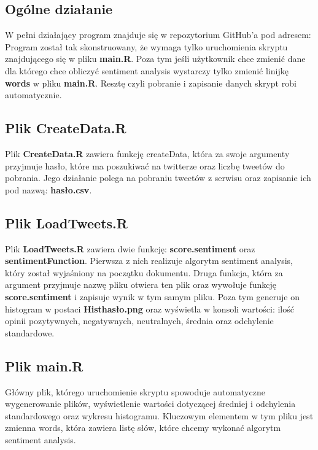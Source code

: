 \documentclass[12pt,a4paper]{report}
\begin{document}
\subsection[Ogólne działanie] {Ogólne działanie}
W pełni działający program znajduje się w repozytorium GitHub'a pod adresem: \\
Program został tak skonstruowany, że wymaga tylko uruchomienia skryptu znajdującego się w pliku \textbf{main.R}. Poza tym jeśli użytkownik chce zmienić dane dla którego chce obliczyć sentiment analysis wystarczy tylko zmienić linijkę \textbf{words} w pliku \textbf{main.R}. Resztę czyli pobranie i zapisanie danych skrypt robi automatycznie.
\subsection[Plik CreateData.R]{Plik CreateData.R}
Plik \textbf{CreateData.R} zawiera funkcję createData, która za swoje argumenty przyjmuje hasło, które ma poszukiwać na twitterze oraz liczbę tweetów do pobrania. Jego działanie polega na pobraniu tweetów z serwisu oraz zapisanie ich pod nazwą: \textbf{hasło.csv}.

\subsection[Plik LoadTweets.R]{Plik LoadTweets.R}
Plik \textbf{LoadTweets.R} zawiera dwie funkcję: \textbf{score.sentiment} oraz \textbf{sentimentFunction}. Pierwsza z nich realizuje algorytm sentiment analysis, który został wyjaśniony na początku dokumentu. Druga funkcja, która za argument przyjmuje nazwę pliku otwiera ten plik oraz wywołuje funkcję \textbf{score.sentiment} i zapisuje wynik w tym samym pliku. Poza tym generuje on histogram w postaci \textbf{Histhasło.png} oraz wyświetla w konsoli wartości: ilość opinii pozytywnych, negatywnych, neutralnych, średnia oraz odchylenie standardowe.

\subsection[Plik main.R]{Plik main.R}
Główny plik, którego uruchomienie skryptu spowoduje automatyczne wygenerowanie plików, wyświetlenie wartości dotyczącej średniej i odchylenia standardowego oraz wykresu histogramu. Kluczowym elementem w tym pliku jest zmienna words, która zawiera listę słów, które chcemy wykonać algorytm sentiment analysis. 
\end{document}
